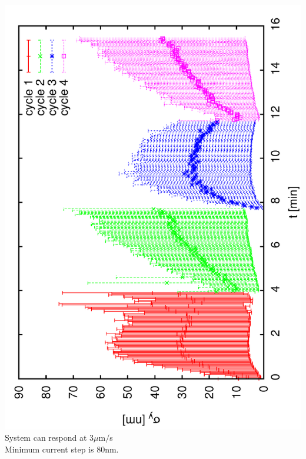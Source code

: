 \documentclass[a4paper,11pt]{book}
\begin{document}
\includegraphics[angle=-90,scale=0.22]{image25.pdf}\\
System can respond at 3$\mu$m$/$s\\
Minimum current step is 80nm.
\end{document}
